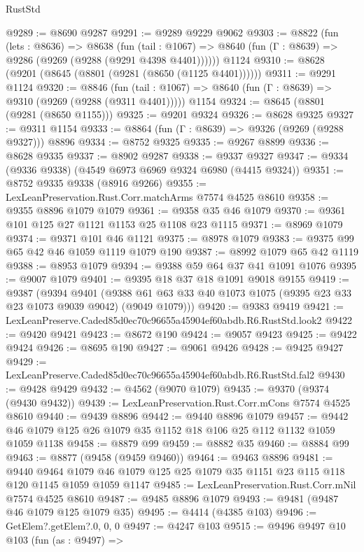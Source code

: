 \begin{lexlean}{RustStd}
\begin{coremodule}
@9289 := @8690 @9287
@9291 := @9289 @9229 @9062
@9303 := @8822
    (fun (lets : @8636) =>
    @8638
      (fun (tail : @1067) => @8640 (fun (Γ : @8639) => @9286 (@9269 (@9288 (@9291 @4398 @4401))))))
    @1124
@9310 := @8628 (@9201 (@8645 (@8801 (@9281 (@8650 (@1125 @4401))))))
@9311 := @9291 @1124
@9320 := @8846
    (fun (tail : @1067) => @8640 (fun (Γ : @8639) => @9310 (@9269 (@9288 (@9311 @4401)))))
    @1154
@9324 := @8645 (@8801 (@9281 (@8650 @1155)))
@9325 := @9201 @9324
@9326 := @8628 @9325
@9327 := @9311 @1154
@9333 := @8864 (fun (Γ : @8639) => @9326 (@9269 (@9288 @9327))) @8896
@9334 := @8752 @9325
@9335 := @9267 @8899
@9336 := @8628 @9335
@9337 := @8902 @9287
@9338 := @9337 @9327
@9347 := @9334 (@9336 @9338) (@4549 @6973 @6969 @9324 @6980 (@4415 @9324))
@9351 := @8752 @9335 @9338 (@8916 @9266)
@9355 := LexLeanPreservation.Rust.Corr.matchArms @7574 @4525 @8610
@9358 := @9355 @8896 @1079 @1079
@9361 := @9358 @35 @46 @1079
@9370 := @9361 @101 @125 @27 @1121 @1153 @25 @1108 @23 @1115
@9371 := @8969 @1079
@9374 := @9371 @101 @46 @1121
@9375 := @8978 @1079
@9383 := @9375 @99 @65 @42 @46 @1059 @1119 @1079 @190
@9387 := @8992 @1079 @65 @42 @1119
@9388 := @8953 @1079
@9394 := @9388 @59 @64 @37 @41 @1091 @1076
@9395 := @9007 @1079
@9401 := @9395 @18 @37 @18 @1091 @9018 @9155
@9419 := @9387
    (@9394
      @9401
      (@9388 @61 @63 @33 @40 @1073 @1075 (@9395 @23 @33 @23 @1073 @9039 @9042) (@9049 @1079)))
@9420 := @9383 @9419
@9421 := LexLeanPreserve.Caded85d0ec70c96655a45904ef60abdb.R6.RustStd.look2
@9422 := @9420 @9421
@9423 := @8672 @190
@9424 := @9057 @9423
@9425 := @9422 @9424
@9426 := @8695 @190
@9427 := @9061 @9426
@9428 := @9425 @9427
@9429 := LexLeanPreserve.Caded85d0ec70c96655a45904ef60abdb.R6.RustStd.fal2
@9430 := @9428 @9429
@9432 := @4562 (@9070 @1079)
@9435 := @9370 (@9374 (@9430 @9432))
@9439 := LexLeanPreservation.Rust.Corr.mCons @7574 @4525 @8610
@9440 := @9439 @8896
@9442 := @9440 @8896 @1079
@9457 := @9442 @46 @1079 @125 @26 @1079 @35 @1152 @18 @106 @25 @112 @1132 @1059 @1059 @1138
@9458 := @8879 @99
@9459 := @8882 @35
@9460 := @8884 @99
@9463 := @8877 (@9458 (@9459 @9460))
@9464 := @9463 @8896
@9481 := @9440
    @9464
    @1079
    @46
    @1079
    @125
    @25
    @1079
    @35
    @1151
    @23
    @115
    @118
    @120
    @1145
    @1059
    @1059
    @1147
@9485 := LexLeanPreservation.Rust.Corr.mNil @7574 @4525 @8610
@9487 := @9485 @8896 @1079
@9493 := @9481 (@9487 @46 @1079 @125 @1079 @35)
@9495 := @4414 (@4385 @103)
@9496 := GetElem?.getElem?.{0, 0, 0}
@9497 := @4247 @103
@9515 := @9496
    @9497
    @10
    @103
    (fun (as : @9497) =>

\end{coremodule}
\end{lexlean}
